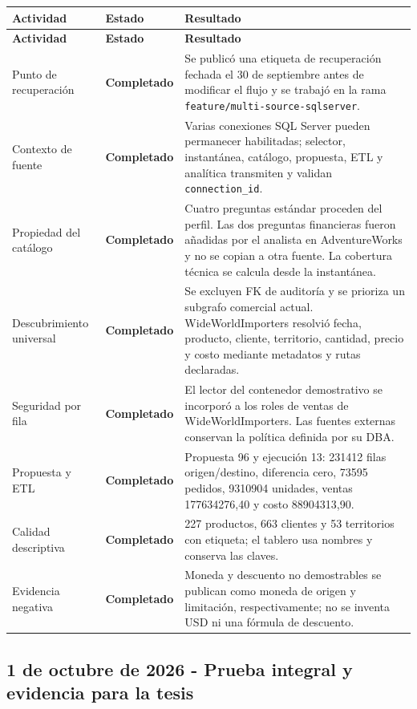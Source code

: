 \documentclass[11pt,letterpaper]{article}
\newcommand{\statusok}{\textcolor{deepgreen}{\textbf{Completado}}}
\newcommand{\file}[1]{\texttt{#1}}
\begin{document}
\begin{longtable}{@{}p{}p{}p{}@{}}
  \toprule
  \textbf{Actividad} & \textbf{Estado} & \textbf{Resultado} \\
  \midrule
  \endfirsthead
  \toprule
  \textbf{Actividad} & \textbf{Estado} & \textbf{Resultado} \\
  \midrule
  \endhead
  Punto de recuperación & \statusok & Se publicó una etiqueta de recuperación fechada el 30 de septiembre antes de modificar el flujo y se trabajó en la rama \file{feature/multi-source-sqlserver}. \\
  Contexto de fuente & \statusok & Varias conexiones SQL Server pueden permanecer habilitadas; selector, instantánea, catálogo, propuesta, ETL y analítica transmiten y validan \file{connection\_id}. \\
  Propiedad del catálogo & \statusok & Cuatro preguntas estándar proceden del perfil. Las dos preguntas financieras fueron añadidas por el analista en AdventureWorks y no se copian a otra fuente. La cobertura técnica se calcula desde la instantánea. \\
  Descubrimiento universal & \statusok & Se excluyen FK de auditoría y se prioriza un subgrafo comercial actual. WideWorldImporters resolvió fecha, producto, cliente, territorio, cantidad, precio y costo mediante metadatos y rutas declaradas. \\
  Seguridad por fila & \statusok & El lector del contenedor demostrativo se incorporó a los roles de ventas de WideWorldImporters. Las fuentes externas conservan la política definida por su DBA. \\
  Propuesta y ETL & \statusok & Propuesta 96 y ejecución 13: 231412 filas origen/destino, diferencia cero, 73595 pedidos, 9310904 unidades, ventas 177634276,40 y costo 88904313,90. \\
  Calidad descriptiva & \statusok & 227 productos, 663 clientes y 53 territorios con etiqueta; el tablero usa nombres y conserva las claves. \\
  Evidencia negativa & \statusok & Moneda y descuento no demostrables se publican como moneda de origen y limitación, respectivamente; no se inventa USD ni una fórmula de descuento. \\
  \bottomrule
\end{longtable}

\subsection{1 de octubre de 2026 - Prueba integral y evidencia para la tesis}
\end{document}
